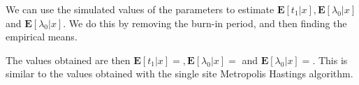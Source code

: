 

We can use the simulated values of the parameters to estimate $\mathbf{E}[t_1|x], \mathbf{E}[\lambda_0|x]$ and $\mathbf{E}[\lambda_0|x]$. We do this by removing the burn-in period, and then finding the empirical means. 



The values obtained are then $\mathbf{E}[t_1|x] = , \mathbf{E}[\lambda_0|x] = $ and $\mathbf{E}[\lambda_0|x] = $. This is similar to the values obtained with the single site Metropolis Hastings algorithm. 